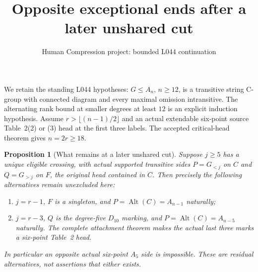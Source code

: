 \documentclass[11pt,a4paper]{article}
\title{Opposite exceptional ends after a later unshared cut}
\author{Human Compression project: bounded L044 continuation}
\date{}
\newtheorem{proposition}{Proposition}
\newcommand{\Alt}{\operatorname{Alt}}
\begin{document}
\maketitle
We retain the standing L044 hypotheses: $G\le A_n$, $n\ge12$,
is a transitive string C-group with connected diagram and every
maximal omission intransitive. The alternating rank bound at smaller
degrees at least $12$ is an explicit induction hypothesis.
Assume $r>\lfloor(n-1)/2\rfloor$ and an actual extendable
six-point source Table~2(2) or (3) head at the first three labels.
The accepted critical-head theorem gives $n=2r\ge18$.

\begin{proposition}[What remains at a later unshared cut]
Suppose $j\ge5$ has a unique eligible crossing, with actual supported
transitive sides $P=G_{<j}$ on $C$ and $Q=G_{>j}$ on $F$, the
original head contained in $C$. Then precisely the following
alternatives remain unexcluded here:
\begin{enumerate}
\item $j=r-1$, $F$ is a singleton, and $P=\Alt(C)=A_{n-1}$ naturally;
\item $j=r-3$, $Q$ is the degree-five $D_{10}$ marking, and
      $P=\Alt(C)=A_{n-5}$ naturally. The complete attachment theorem
      makes the actual last three marks a six-point Table~2 head.
\end{enumerate}
In particular an opposite actual six-point $A_5$ side is impossible.
These are residual alternatives, not assertions that either exists.
\end{proposition}
\end{document}
